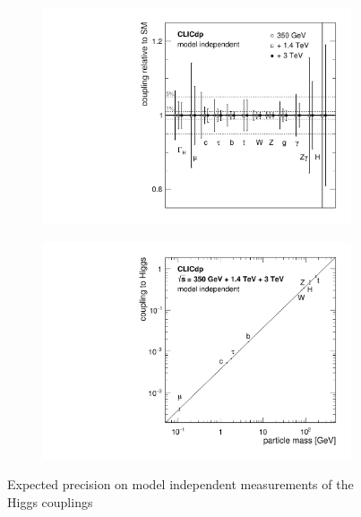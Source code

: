 \begin{figure}
  \centering
  \begin{subfigure}{.4\textwidth}
    \centering
    \includegraphics[width=1.0\linewidth]{Theory/fig/FitResultsMI.pdf}
  \end{subfigure}
    \begin{subfigure}{.4\textwidth}
    \centering
    \includegraphics[width=1.0\linewidth]{Theory/fig/CouplingvsMassMI.pdf}
  \end{subfigure}
    \caption[Expected precision on model independent measurements of the Higgs couplings]{Expected precision on model independent measurements of the Higgs couplings \cite{Abramowicz:2016zbo}}
  \label{fig:modelIndependentCouplings}
\end{figure}

